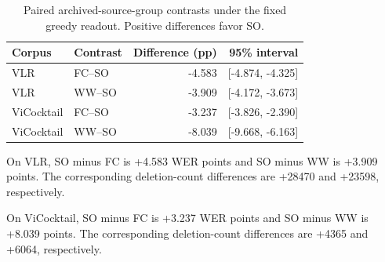 \begin{table}[htbp]
\centering\small
\caption{Paired archived-source-group contrasts under the fixed greedy readout. Positive differences favor SO.}
\begin{tabular}{llrr}
\toprule
Corpus & Contrast & Difference (pp) & 95\% interval\\
\midrule
VLR & FC--SO & -4.583 & [-4.874, -4.325]\\
VLR & WW--SO & -3.909 & [-4.172, -3.673]\\
ViCocktail & FC--SO & -3.237 & [-3.826, -2.390]\\
ViCocktail & WW--SO & -8.039 & [-9.668, -6.163]\\
\bottomrule
\end{tabular}
\end{table}
\clearpage
On VLR, SO minus FC is +4.583 WER points and SO minus WW is +3.909 points. The corresponding deletion-count differences are +28470 and +23598, respectively.

On ViCocktail, SO minus FC is +3.237 WER points and SO minus WW is +8.039 points. The corresponding deletion-count differences are +4365 and +6064, respectively.

